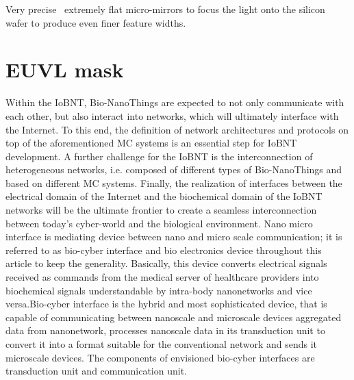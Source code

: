 \documentclass[12pt,a4paper]{report}
\begin{document}
Very precise  extremely flat micro-mirrors to 
focus the light onto the silicon wafer to 
produce even finer feature widths.





\chapter{EUVL mask}
Within the IoBNT, Bio-NanoThings are expected to not only 
communicate with each other, but
also interact into networks, which will ultimately
interface with the Internet. To this end, the definition of 
network architectures and protocols on
top of the aforementioned MC systems is an
essential step for IoBNT development. A further
challenge for the IoBNT is the interconnection
of heterogeneous networks, i.e. composed of different types 
of Bio-NanoThings and based on
different MC systems. Finally, the realization of
interfaces between the electrical domain of the
Internet and the biochemical domain of the
IoBNT networks will be the ultimate frontier to
create a seamless interconnection between
today’s cyber-world and the biological environment. Nano micro
 interface is mediating device between nano and
micro scale communication; it is referred to as bio-cyber
interface and bio electronics device throughout this article to 
keep the generality. Basically, this device converts electrical
signals received as commands from the medical server of
healthcare providers into biochemical signals understandable
by intra-body nanonetworks and vice versa.Bio-cyber interface is 
the hybrid and most sophisticated
device, that is capable of communicating between nanoscale and 
microscale devices aggregated data from nanonetwork, processes 
nanoscale data in its transduction unit to convert it into a 
format suitable for the conventional network and sends it
microscale devices. The components of envisioned bio-cyber 
interfaces are transduction unit and communication unit.
\end{document}
